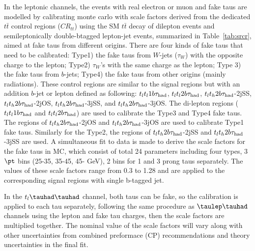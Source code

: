 In the leptonic channels, the events with real electron or muon and fake taus are modelled by calibrating monte carlo with scale factors
derived from the dedicated $t\bar t$
control regions ($CR_{tt}$) using the SM $t\bar t$ decay of dilepton events and semileptonically double-btagged lepton-jet events, summarized in Table~\ref{tab:srcr},
aimed at fake taus from different origins. There are four kinds of fake taus that need to be calibrated: Type1) the fake taus from $W$-jets ($\tau_{W}$)
with the opposite charge to the lepton;
Type2) $\tau_{W}$'s with the same charge as the lepton; Type 3) the fake taus from $b$-jets; Type4) the fake taus from other origins (mainly radiations).
These control regions are similar to the signal regions but with an addition $b$-jet or lepton defined as following:
$t_lt_l1b\tau_\text{had}$, $t_lt_l2b\tau_\text{had}$, $t_lt_h2b\tau_\text{had}$-2jSS, $t_lt_h2b\tau_\text{had}$-2jOS, $t_lt_h2b\tau_\text{had}$-3jSS, and $t_lt_h2b\tau_\text{had}$-3jOS.
The di-lepton regions ($t_lt_l1b\tau_\text{had}$ and $t_lt_l2b\tau_\text{had}$) are used to calibrate the Type3 and Type4 fake taus. The regions of
$t_lt_h2b\tau_\text{had}$-2jOS and $t_lt_h2b\tau_\text{had}$-3jOS are used to calibrate Type1 fake taus.
Similarly for the Type2, the regions of $t_lt_h2b\tau_\text{had}$-2jSS and $t_lt_h2b\tau_\text{had}$-3jSS are used.
A simultaneous fit to data is made to derive the scale factors for the fake taus in MC, which consist of total 24 parameters
including four types, 3 $\pt$ bins (25-35, 35-45, 45- GeV), 2 bins for 1 and 3 prong taus separately.
The values of these scale factors range from 0.3 to 1.28 and are applied to the corresponding signal regions with single b-tagged jet.

In the $t_l\thadhad$ channel, both taus can be fake, so the calibration is applied to each tau separately, following the same procedure as $\tlhad$ channels using the
lepton and fake tau charges, then the scale factors are multiplied together. The nominal value of the scale factors will vary along with other uncertainties from
combined preformace (CP) recommendations and theory uncertainties in the final fit.

